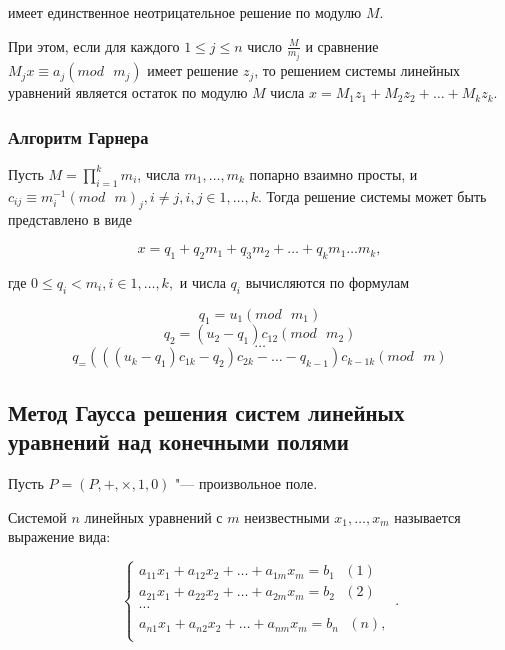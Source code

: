 \documentclass[bachelor, och, labwork]{SCWorks}
\begin{document}
        имеет единственное неотрицательное решение по модулю $M$. 
        
        При этом, если для каждого $1 \leq j \leq n$ число $\frac{M}{m_j}$ 
        и сравнение $M_j x \equiv a_j (mod \text{ } m_j)$ имеет решение $z_j$,
        то решением системы линейных уравнений является остаток по модулю $M$
        числа $x = M_1 z_1 + M_2 z_2 + \dots + M_k z_k$.

    \subsubsection{Алгоритм Гарнера}

        Пусть $M = \prod_{i = 1}^{k} m_i$, числа $m_1, \dots, m_k$ попарно
        взаимно просты, и $c_{ij} \equiv m_i^{-1} (mod \text{ } m)_j, i \neq j,
        i,j \in 1, \dots, k.$ Тогда решение системы может быть представлено в
        виде

        $$x = q_1 + q_2 m_1 + q_3 m_2 + \dots + q_k m_1 \dots m_k,$$

        где $0 \leq q_i < m_i, i \in 1, \dots, k,$ и числа $q_i$ вычисляются по
        формулам

        $$q_1 = u_1 (mod \text{ } m_1)$$
        $$q_2 = (u_2 - q_1)c_{12} (mod \text{ } m_2)$$
        $$\dots$$
        $$q_ = (((u_k - q_1)c_{1k} - q_2)c_{2k} - \dots - q_{k-1})c_{k-1k} (mod \text{ } m)$$
    
    \subsection{Метод Гаусса решения систем линейных уравнений над конечными
    полями}

        Пусть $P = (P, +, \times, 1, 0)$ "--- произвольное поле.

        Системой $n$ линейных уравнений с $m$ неизвестными $x_1, \dots, x_m$
        называется выражение вида:
        
        \begin{equation}
            \begin{cases}
                a_{11} x_1 + a_{12} x_2 + \dots + a_{1m}x_m = b_1 \text{ } (1)\\            
                a_{21} x_1 + a_{22} x_2 + \dots + a_{2m}x_m = b_2 \text{ } (2)\\            
                \cdots\\
                a_{n1} x_1 + a_{n2} x_2 + \dots + a_{nm}x_m = b_n \text{ } (n),\\            
            \end{cases}\,.
        \end{equation}
        
\end{document}
